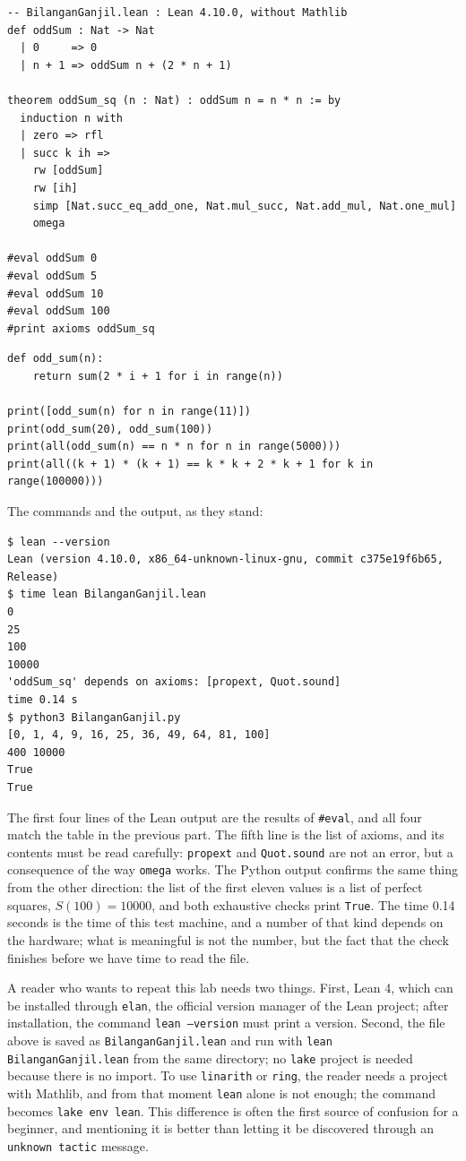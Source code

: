 \begin{lab}
\begin{verbatim}
-- BilanganGanjil.lean : Lean 4.10.0, without Mathlib
def oddSum : Nat -> Nat
  | 0     => 0
  | n + 1 => oddSum n + (2 * n + 1)

theorem oddSum_sq (n : Nat) : oddSum n = n * n := by
  induction n with
  | zero => rfl
  | succ k ih =>
    rw [oddSum]
    rw [ih]
    simp [Nat.succ_eq_add_one, Nat.mul_succ, Nat.add_mul, Nat.one_mul]
    omega

#eval oddSum 0
#eval oddSum 5
#eval oddSum 10
#eval oddSum 100
#print axioms oddSum_sq
\end{verbatim}

\begin{verbatim}
def odd_sum(n):
    return sum(2 * i + 1 for i in range(n))

print([odd_sum(n) for n in range(11)])
print(odd_sum(20), odd_sum(100))
print(all(odd_sum(n) == n * n for n in range(5000)))
print(all((k + 1) * (k + 1) == k * k + 2 * k + 1 for k in range(100000)))
\end{verbatim}
\end{lab}

The commands and the output, as they stand:

\begin{verbatim}
$ lean --version
Lean (version 4.10.0, x86_64-unknown-linux-gnu, commit c375e19f6b65, Release)
$ time lean BilanganGanjil.lean
0
25
100
10000
'oddSum_sq' depends on axioms: [propext, Quot.sound]
time 0.14 s
$ python3 BilanganGanjil.py
[0, 1, 4, 9, 16, 25, 36, 49, 64, 81, 100]
400 10000
True
True
\end{verbatim}

The first four lines of the Lean output are the results of \texttt{\#eval}, and all four match the
table in the previous part. The fifth line is the list of axioms, and its contents must be read
carefully: \texttt{propext} and \texttt{Quot.sound} are not an error, but a consequence of the way
\texttt{omega} works. The Python output confirms the same thing from the other direction: the list of
the first eleven values is a list of perfect squares, $S(100)=10000$, and both exhaustive checks
print \texttt{True}. The time 0.14 seconds is the time of this test machine, and a number of that
kind depends on the hardware; what is meaningful is not the number, but the fact that the check
finishes before we have time to read the file.

A reader who wants to repeat this lab needs two things. First, Lean 4, which can be installed through
\texttt{elan}, the official version manager of the Lean project; after installation, the command
\texttt{lean --version} must print a version. Second, the file above is saved as
\texttt{BilanganGanjil.lean} and run with \texttt{lean BilanganGanjil.lean} from the same directory;
no \texttt{lake} project is needed because there is no import. To use \texttt{linarith} or
\texttt{ring}, the reader needs a project with Mathlib, and from that moment \texttt{lean} alone is
not enough; the command becomes \texttt{lake env lean}. This difference is often the first source of
confusion for a beginner, and mentioning it is better than letting it be discovered through an
\texttt{unknown tactic} message.

